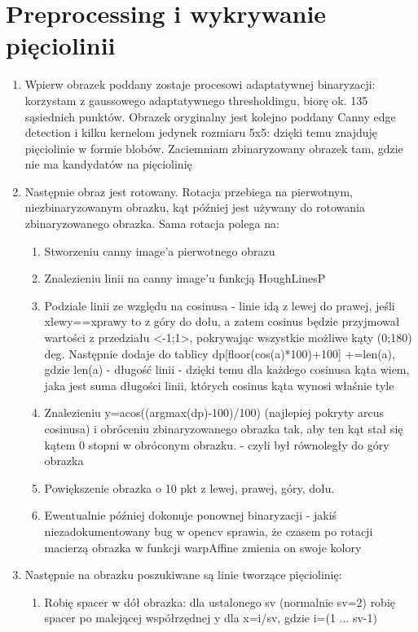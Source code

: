 \documentclass[12pt]{article}
\begin{document}
	\section{Preprocessing i wykrywanie pięciolinii}
	\begin{enumerate}
		\item{Wpierw obrazek poddany zostaje procesowi adaptatywnej binaryzacji: korzystam z gaussowego adaptatywnego thresholdingu, biorę ok. 135 sąsiednich punktów. Obrazek oryginalny jest kolejno poddany 
		Canny edge detection i kilku kernelom jedynek rozmiaru 5x5: dzięki temu znajduję pięciolinie w formie blobów. Zaciemniam zbinaryzowany obrazek tam, gdzie nie ma kandydatów na pięciolinię}
		\item{Następnie obraz jest rotowany. Rotacja przebiega na pierwotnym, niezbinaryzowanym obrazku, kąt później jest używany do rotowania zbinaryzowanego obrazka. Sama rotacja polega na:}
		\begin{enumerate}
			\item{Stworzeniu canny image'a pierwotnego obrazu}
			\item{Znalezieniu linii na canny image'u funkcją HoughLinesP}
			\item{Podziale linii ze względu na cosinusa - linie idą z lewej do prawej, jeśli xlewy==xprawy to z góry do dołu, a zatem cosinus będzie przyjmował wartości z przedziału <-1;1>, pokrywając
			 wszystkie możliwe kąty (0;180) deg. Następnie dodaje do tablicy dp[floor(cos(a)*100)+100] +=len(a), gdzie len(a) - długość linii - dzięki temu dla każdego cosinusa kąta wiem, jaka jest suma długości 
			 linii, których cosinus kąta wynosi właśnie tyle}
			 \item{Znalezieniu y=acos((argmax(dp)-100)/100) (najlepiej pokryty arcus cosinusa) i obróceniu zbinaryzowanego obrazka tak, aby ten kąt stał się kątem 0 stopni w obróconym obrazku. - 
			 czyli był równoległy do góry obrazka}
			 \item{Powiększenie obrazka o 10 pkt z lewej, prawej, góry, dołu.}
			 \item{Ewentualnie później dokonuje ponownej binaryzacji - jakiś niezadokumentowany bug w opencv sprawia, że czasem po rotacji macierzą obrazka w funkcji warpAffine zmienia on swoje kolory}
		\end{enumerate}
		\item{Następnie na obrazku poszukiwane są linie tworzące pięciolinię:}
		\begin{enumerate}
			\item{Robię spacer w dół obrazka: dla ustalonego sv (normalnie sv=2) robię spacer po malejącej współrzędnej y dla x=i/sv, gdzie i=(1 ... sv-1)}

\end{enumerate}
\end{enumerate}
\end{document}

